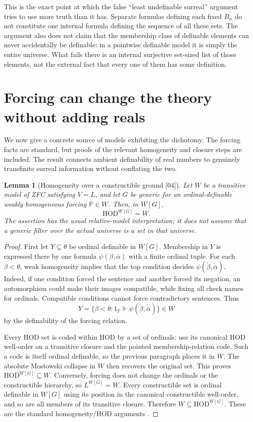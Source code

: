 \documentclass[11pt,a4paper]{article}
\numberwithin{equation}{section}
\newtheorem{lemma}[lemma]{Lemma}
\theoremstyle{definition}
\theoremstyle{remark}
\newcommand{\HOD}{\mathrm{HOD}}
\newcommand{\src}[1]{\textup{\textsf{\small[#1]}}}
\begin{document}
This is the exact point at which the false ``least undefinable
surreal'' argument tries to use more truth than it has. Separate
formulas defining each fixed $B_n$ do not constitute one internal
formula defining the sequence of all these sets. The argument also
does not claim that the membership class of definable elements can
never accidentally be definable: in a pointwise definable model it
is simply the entire universe. What fails there is an internal
surjective set-sized list of those elements, not the external fact
that every one of them has some definition.

\section{Forcing can change the theory without adding reals}
\label{dsn:sec:forcing}

We now give a concrete source of models exhibiting the dichotomy.
The forcing facts are standard, but proofs of the relevant
homogeneity and closure steps are included. The result connects
ambient definability of real numbers to genuinely transfinite
surreal information without conflating the two.

\begin{lemma}[Homogeneity over a constructible ground \src{04}]
\label{dsn:lem:forcingHOD}
Let $W$ be a transitive model of ZFC satisfying $V=L$, and let
$G$ be generic for an ordinal-definable weakly homogeneous forcing
$\mathbb P\in W$. Then, in $W[G]$,
\[
 \HOD^{W[G]}=W.
\]
The assertion has the usual relative-model interpretation; it does
not assume that a generic filter over the actual universe is a set
in that universe.
\end{lemma}
\begin{proof}
First let $Y\subseteq\theta$ be ordinal definable in $W[G]$.
Membership in $Y$ is expressed there by one formula
$\psi(\beta,\bar\alpha)$ with a finite ordinal tuple. For each
$\beta<\theta$, weak homogeneity implies that the top condition
decides $\psi(\check\beta,\check{\bar\alpha})$.
Indeed, if one condition forced the sentence and another forced its
negation, an automorphism could make their images compatible, while
fixing all check names for ordinals. Compatible conditions cannot
force contradictory sentences. Thus
\[
 Y=\{\beta<\theta:1_{\mathbb P}\Vdash
                 \psi(\check\beta,\check{\bar\alpha})\}\in W
\]
by the definability of the forcing relation.

Every $\HOD$ set is coded within $\HOD$ by a set of ordinals: use its
canonical $\HOD$ well-order on a transitive closure and the pointed
membership-relation code. Such a code is itself ordinal definable,
so the previous paragraph places it in $W$. The absolute Mostowski
collapse in $W$ then recovers the original set. This proves
$\HOD^{W[G]}\subseteq W$.
Conversely, forcing does not change the ordinals or the constructible
hierarchy, so $L^{W[G]}=W$. Every constructible set is ordinal
definable in $W[G]$ using its position in the canonical constructible
well-order, and so are all members of its transitive closure.
Therefore $W\subseteq\HOD^{W[G]}$.
These are the standard homogeneity/$\HOD$ arguments \cite{Jech}.
\end{proof}
\end{document}
